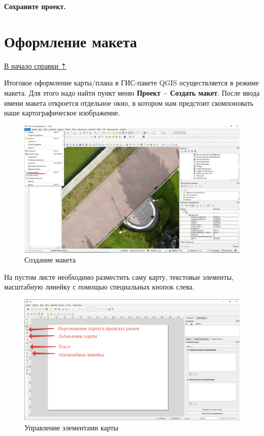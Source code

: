 \documentclass[
  12pt,
]{book}
\begin{document}
\textbf{Сохраните проект.}

\section{Оформление макета}\label{symbols-layout}

\hyperref[symbols]{В начало справки ⇡}

Итоговое оформление карты/плана в ГИС-пакете QGIS осуществляется в режиме макета. Для этого надо найти пункт меню \textbf{Проект -- Создать макет}. После ввода имени макета откроется отдельное окно, в котором нам предстоит скомпоновать наше картографическое изображение.

\begin{figure}
\centering
\includegraphics{images/symbology/New_layout.png}
\caption{Создание макета}
\end{figure}

На пустом листе необходимо разместить саму карту, текстовые элементы, масштабную линейку с помощью специальных кнопок слева.

\begin{figure}
\centering
\includegraphics{images/symbology/Map_elements.png}
\caption{Управление элементами карты}
\end{figure}
\end{document}
